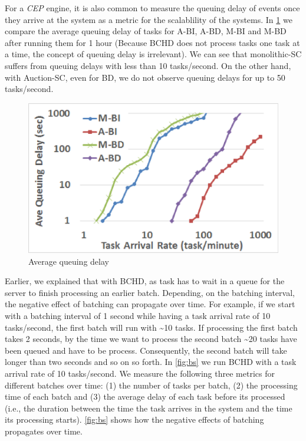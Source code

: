 For a \emph{CEP} engine, it is also common to measure the queuing delay of events \cite{Wu06} once they arrive at the system as a metric for the scalablility of the systems. In \cref{fig:queue} we compare the average queuing delay of tasks for A-BI, A-BD, M-BI and M-BD after running them for 1 hour (Because BCHD does not process tasks one task at a time, the concept of queuing delay is irrelevant). We can see that monolithic-SC suffers from queuing delays with less than 10 tasks/second. On the other hand, with Auction-SC, even for BD, we do not observe queuing delays for up to 50 tasks/second.

\begin{figure}[h]
	\centering
	\includegraphics[width = 0.75\columnwidth]{figures/queue.eps}
	\vspace{-0.1in}
	\caption{Average queuing delay}\label{fig:queue}
\end{figure}

Earlier, we explained that with BCHD, as task has to wait in a queue for the server to finish processing an earlier batch. Depending, on the batching interval, the negative effect of batching can propagate over time. For example, if we start with a batching interval of 1 second while having a task arrival rate of 10 tasks/second, the first batch will run with \textasciitilde 10 tasks. If processing the first batch takes 2 seconds, by the time we want to process the second batch \textasciitilde 20 tasks have been queued and have to be process. Consequently, the second batch will take longer than two seconds and so on so forth. In \cref{fig:bs} we run BCHD with a task arrival rate of 10 tasks/second. We measure the following three metrics for different batches over time: (1) the number of tasks per batch, (2) the processing time of each batch and (3) the average delay of each task before its processed (i.e., the duration between the time the task arrives in the system and the time its processing starts). \cref{fig:bs} shows how the negative effects of batching propagates over time.

